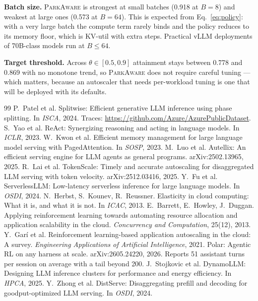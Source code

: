 \documentclass[sigconf,nonacm]{acmart}
\newcommand{\sys}{\textsc{ParkAware}\xspace}
\begin{document}
\textbf{Batch size.} \sys is strongest at small batches (0.918 at
$B{=}8$) and weakest at large ones (0.573 at $B{=}64$). This is expected
from Eq.~\eqref{eq:policy}: with a very large batch the compute term
rarely binds and the policy reduces to its memory floor, which is
KV-util with extra steps. Practical vLLM deployments of 70B-class models
run at $B\le64$.

\textbf{Target threshold.} Across $\theta\in[0.5,0.9]$ attainment stays
between 0.778 and 0.869 with no monotone trend, so \sys does not require
careful tuning --- which matters, because an autoscaler that needs
per-workload tuning is one that will be deployed with its defaults.


\begin{thebibliography}{99}
\small
{} P.~Patel et al. Splitwise: Efficient generative LLM
inference using phase splitting. In \emph{ISCA}, 2024. Traces:
\url{https://github.com/Azure/AzurePublicDataset}.
 S.~Yao et al. ReAct: Synergizing reasoning and acting in
language models. In \emph{ICLR}, 2023.
 W.~Kwon et al. Efficient memory management for large
language model serving with PagedAttention. In \emph{SOSP}, 2023.
 M.~Luo et al. Autellix: An efficient serving engine for
LLM agents as general programs. arXiv:2502.13965, 2025.
 R.~Lai et al. TokenScale: Timely and accurate
autoscaling for disaggregated LLM serving with token velocity.
arXiv:2512.03416, 2025.
 Y.~Fu et al. ServerlessLLM: Low-latency serverless
inference for large language models. In \emph{OSDI}, 2024.
 N.~Herbst, S.~Kounev, R.~Reussner. Elasticity in cloud
computing: What it is, and what it is not. In \emph{ICAC}, 2013.
 E.~Barrett, E.~Howley, J.~Duggan. Applying
reinforcement learning towards automating resource allocation and
application scalability in the cloud. \emph{Concurrency and Computation},
25(12), 2013.
 Y.~Gar\'i et al. Reinforcement learning-based application
autoscaling in the cloud: A survey. \emph{Engineering Applications of
Artificial Intelligence}, 2021.
 Polar: Agentic RL on any harness at scale.
arXiv:2605.24220, 2026. Reports 51 assistant turns per session on average
with a tail beyond 200.
 J.~Stojkovic et al. DynamoLLM: Designing LLM
inference clusters for performance and energy efficiency. In \emph{HPCA},
2025.
 Y.~Zhong et al. DistServe: Disaggregating prefill and
decoding for goodput-optimized LLM serving. In \emph{OSDI}, 2024.
\end{thebibliography}
\end{document}
